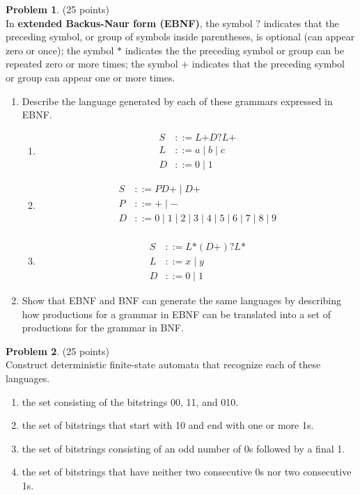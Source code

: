 \documentclass{article}
\theoremstyle{definition}
\newtheorem{problem}{Problem}
\newtheorem*{solution}{Solution}
\begin{document}
\begin{problem} (25 points)\\
In \textbf{extended Backus-Naur form (EBNF)}, the symbol $?$ indicates that the preceding symbol, or group of symbols inside parentheses, is optional (can appear zero or once); the symbol $*$ indicates the the preceding symbol or group can be repeated zero or more times; the symbol $+$ indicates that the preceding symbol or group can appear one or more times.
\begin{enumerate}
\item Describe the language generated by each of these grammars expressed in EBNF.
\begin{enumerate}
\item 
\begin{align*}
S & ::= L\text{+}D\text{?}L\text{+}\\
L & ::= a \mid b \mid c\\
D & ::= 0 \mid 1
\end{align*}
\item 
\begin{align*}
S & ::= PD\text{+} \mid D\text{+}\\
P & ::= + \mid -\\
D & ::= 0 \mid 1 \mid 2 \mid 3 \mid 4 \mid 5 \mid 6 \mid 7 \mid 8 \mid 9\\
\end{align*}
\item 
\begin{align*}
S & ::= L\text{*}(D\text{+})\text{?}L\text{*}\\
L & ::= x \mid y\\
D & ::= 0 \mid 1
\end{align*}
\end{enumerate}
\item Show that EBNF and BNF can generate the same languages by describing how productions for a grammar in EBNF can be translated into a set of productions for the grammar in BNF.
\end{enumerate}
\end{problem}



\begin{problem} (25 points)\\
Construct deterministic finite-state automata that recognize each of these languages.
\begin{enumerate}
\item the set consisting of the bitstrings 00, 11, and 010.
\item the set of bitstrings that start with 10 and end with one or more 1s.
\item the set of bitstrings consisting of an odd number of 0s followed by a final 1.
\item the set of bitstrings that have neither two consecutive 0s nor two consecutive 1s.
\end{enumerate}
\end{problem}
\end{document}
